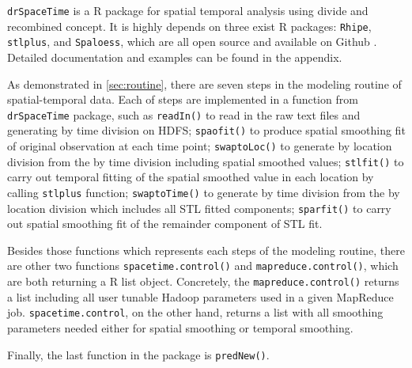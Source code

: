 \texttt{drSpaceTime} is a R package for spatial temporal analysis using divide 
and recombined concept. It is highly depends on three exist R packages: 
\texttt{Rhipe}, \texttt{stlplus}, and \texttt{Spaloess}, which are all open 
source and available on Github \cite{github}. Detailed documentation and examples
can be found in the appendix.

As demonstrated in \ref{sec:routine}, there are seven steps in the modeling 
routine of spatial-temporal data. Each of steps are implemented in a function
from \texttt{drSpaceTime} package, such as \texttt{readIn()} to read in the raw
text files and generating by time division on HDFS; \texttt{spaofit()} to produce
spatial smoothing fit of original observation at each time point; 
\texttt{swaptoLoc()} to generate by location division from the by time division 
including spatial smoothed values; \texttt{stlfit()} to carry out temporal fitting
of the spatial smoothed value in each location by calling \texttt{stlplus} 
function; \texttt{swaptoTime()} to generate by time division from the by location
division which includes all STL fitted components; \texttt{sparfit()} to 
carry out spatial smoothing fit of the remainder component of STL fit.

Besides those functions which represents each steps of the modeling routine, 
there are other two functions \texttt{spacetime.control()} and 
\texttt{mapreduce.control()}, which are both returning a R list object. Concretely,
the \texttt{mapreduce.control()} returns a list including all user tunable 
Hadoop parameters used in a given MapReduce job. \texttt{spacetime.control}, on
the other hand, returns a list with all smoothing parameters needed either for
spatial smoothing or temporal smoothing. 

Finally, the last function in the package is \texttt{predNew()}.
